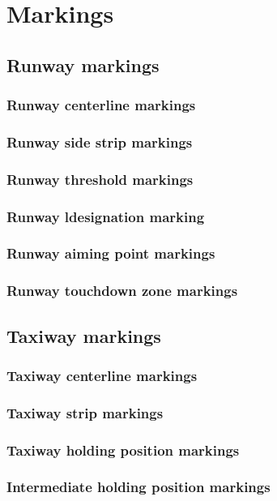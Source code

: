 \chapter{Markings}

	\section{Runway markings}
		\subsection{Runway centerline markings}
		\subsection{Runway side strip markings}
		\subsection{Runway threshold markings}
		\subsection{Runway ldesignation marking}
		\subsection{Runway aiming point markings}
		\subsection{Runway touchdown zone markings}
		
	\section{Taxiway markings}
		\subsection{Taxiway centerline markings}
		\subsection{Taxiway strip markings}
		\subsection{Taxiway holding position markings}
		\subsection{Intermediate holding position markings}
